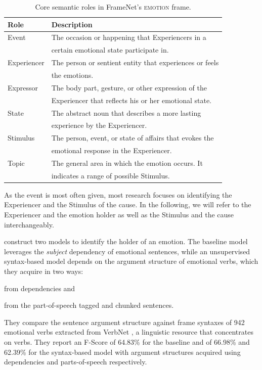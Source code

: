 \begin{table}[]
\centering
\begin{tabular}{ll}
{\bf Role}  & {\bf Description}                                                                                        \\\hline
Event       & The occasion or happening that Experiencers in a\\
            & certain emotional state participate in.\\
Experiencer & The person or sentient entity that experiences or feels\\
            & the emotions.                                     \\
Expressor   & The body part, gesture, or other expression of the \\
            & Experiencer that reflects his or her emotional state. \\
State       & The abstract noun that describes a more lasting\\
            & experience by the Experiencer.                           \\
Stimulus    & The person, event, or state of affairs that evokes the\\
            & emotional response in the Experiencer.            \\
Topic       & The general area in which the emotion occurs. It\\
            & indicates a range of possible Stimulus.                
\end{tabular}
\caption{Core semantic roles in FrameNet's \textsc{emotion} frame.}
\label{tab:core-roles-framenet}
\end{table}

As the event is most often given, most research focuses on identifying the Experiencer and the Stimulus of the cause. In the following, we will refer to the Experiencer and the emotion holder as well as the Stimulus and the cause interchangeably.

\citeauthor{emotion_holder} construct two models to identify the holder of an emotion. The baseline model leverages the \textit{subject} dependency of emotional sentences, while an unsupervised syntax-based model depends on the argument structure of emotional verbs, which they acquire in two ways: 
\begin{inparaenum} \item from dependencies and \item from the part-of-speech tagged and chunked sentences. \end{inparaenum} They compare the sentence argument structure against frame syntaxes of 942 emotional verbs extracted from VerbNet \cite{verbnet}, a linguistic resource that concentrates on verbs. They report an F-Score of 64.83\% for the baseline and of 66.98\% and 62.39\% for the syntax-based model with argument structures acquired using dependencies and parts-of-speech respectively.

